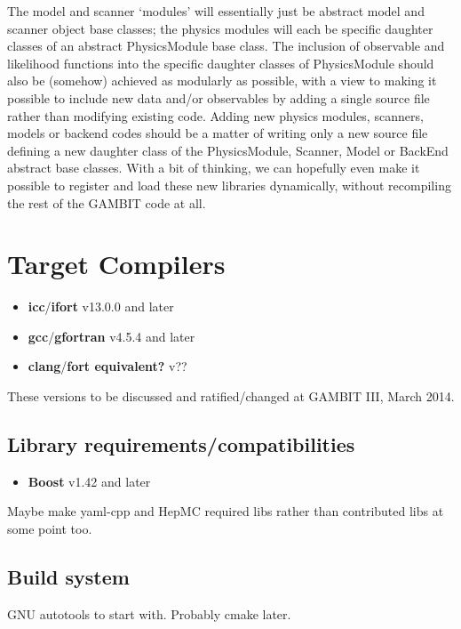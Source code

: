 The model and scanner `modules' will essentially just be abstract model and scanner object base classes; the physics modules will each be specific daughter classes of an abstract PhysicsModule base class.  The inclusion of observable and likelihood functions into the specific daughter classes of PhysicsModule should also be (somehow) achieved as modularly as possible, with a view to making it possible to include new data and/or observables by adding a single source file rather than modifying existing code.  Adding new physics modules, scanners, models or backend codes should be a matter of writing only a new source file defining a new daughter class of the PhysicsModule, Scanner, Model or BackEnd abstract base classes.  With a bit of thinking, we can hopefully even make it possible to register and load these new libraries dynamically, without recompiling the rest of the GAMBIT code at all.

\section{Target Compilers}

\begin{itemize}
\item[]\textbf{icc}/\textbf{ifort} v13.0.0 and later
\item[]\textbf{gcc}/\textbf{gfortran} v4.5.4 and later
\item[]\textbf{clang}/\textbf{fort equivalent?} v??
\end{itemize}

These versions to be discussed and ratified/changed at GAMBIT III, March 2014.

\subsection{Library requirements/compatibilities}

\begin{itemize}
\item[]\textbf{Boost} v1.42 and later
\end{itemize}

Maybe make yaml-cpp and HepMC required libs rather than contributed libs at some point too.

\subsection{Build system}

GNU autotools to start with.  Probably cmake later.

